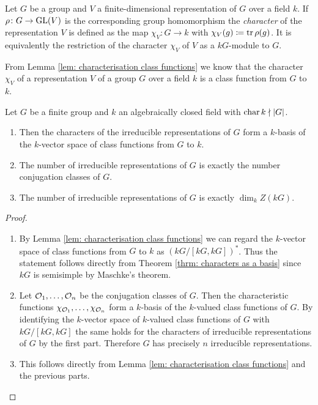 \begin{defi}
  Let $G$ be a group and $V$ a finite-dimensional representation of $G$ over a field $k$. If $\rho \colon G \to \operatorname{GL}(V)$ is the corresponding group homomorphism the \emph{character} of the representation $V$ is defined as the map $\chi_V \colon G \to k$ with $\chi_V(g) \coloneqq \operatorname{tr} \rho(g)$. It is equivalently the restriction of the character $\chi_V$ of $V$ as a $kG$-module to $G$.
\end{defi}


From Lemma \ref{lem: characterisation class functions} we know that the character $\chi_V$ of a representation $V$ of a group $G$ over a field $k$ is a class function from $G$ to $k$.


\begin{prop} \label{prop: conjugation classes and irreducible representations}
  Let $G$ be a finite group and $k$ an algebraically closed field with $\operatorname{char} k \nmid |G|$.
  \begin{enumerate}[label=\emph{\alph*)}, leftmargin=*]
    \item
      Then the characters of the irreducible representations of $G$ form a $k$-basis of the $k$-vector space of class functions from $G$ to $k$.
    \item
      The number of irreducible representations of $G$ is exactly the number conjugation classes of $G$.
    \item
      The number of irreducible representations of $G$ is exactly $\dim_k Z(kG)$.
  \end{enumerate}
\end{prop}
\begin{proof}
  \begin{enumerate}[label=\emph{\alph*)}, leftmargin=*]
    \item
      By Lemma \ref{lem: characterisation class functions} we can regard the $k$-vector space of class functions from $G$ to $k$ as $(kG/[kG,kG])^*$.
      Thus the statement follows directly from Theorem \ref{thrm: characters as a basis} since $kG$ is semisimple by Maschke’s theorem.
    \item
      Let $\mathcal{O}_1, \dotsc, \mathcal{O}_n$ be the conjugation classes of $G$.
      Then the characteristic functions $\chi_{\mathcal{O}_1}, \dotsc, \chi_{\mathcal{O}_n}$ form a $k$-basis of the $k$-valued class functions of $G$.
      By identifying the $k$-vector space of $k$-valued class functions of $G$ with $kG/[kG,kG]$ the same holds for the characters of irreducible representations of $G$ by the first part.
      Therefore $G$ has precisely $n$ irreducible representations.
    \item
      This follows directly from Lemma \ref{lem: characterisation class functions} and the previous parts.
  \end{enumerate}
\end{proof}


